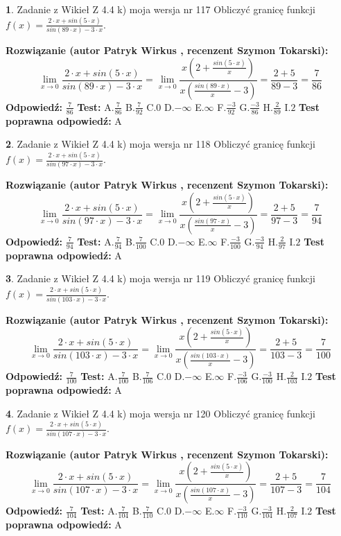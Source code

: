 \documentclass[12pt, a4paper]{article}
\theoremstyle{definition} %
\newtheorem{zad}{}
\newcommand{\zadStart}[1]{\begin{zad}#1\newline}
\newcommand{\zadStop}{\end{zad}}
\newcommand{\rozwStart}[2]{\noindent \textbf{Rozwiązanie (autor #1 , recenzent #2): }\newline}
\newcommand{\rozwStop}{\newline}
\newcommand{\odpStart}{\noindent \textbf{Odpowiedź:}\newline}
\newcommand{\odpStop}{\newline}
\newcommand{\testStart}{\noindent \textbf{Test:}\newline}
\newcommand{\testStop}{\newline}
\newcommand{\kluczStart}{\noindent \textbf{Test poprawna odpowiedź:}\newline}
\newcommand{\kluczStop}{\newline}
\begin{document}
\zadStart{Zadanie z Wikieł Z 4.4 k) moja wersja nr 117}
Obliczyć granicę funkcji $f(x)=\frac{2\cdot x +sin(5\cdot x)}{sin(89\cdot x) -3\cdot x}$.
\zadStop
\rozwStart{Patryk Wirkus}{Szymon Tokarski}
$$\lim\limits_{x\to 0}\frac{2\cdot x +sin(5\cdot x)}{sin(89\cdot x) -3\cdot x}
=\lim\limits_{x\to 0}\frac{x(2+\frac{sin(5\cdot x)}{x})}{x(\frac{sin(89\cdot x)}{x}-3)}
=\frac{2+5}{89-3} = \frac{7}{86}$$
\rozwStop
\odpStart
$\frac{7}{86}$
\odpStop
\testStart
A.$\frac{7}{86}$
B.$\frac{7}{92}$
C.$0$
D.$-\infty$
E.$\infty$
F.$\frac{-3}{92}$
G.$\frac{-3}{86}$
H.$\frac{2}{89}$
I.$2$
\testStop
\kluczStart
A
\kluczStop



\zadStart{Zadanie z Wikieł Z 4.4 k) moja wersja nr 118}
Obliczyć granicę funkcji $f(x)=\frac{2\cdot x +sin(5\cdot x)}{sin(97\cdot x) -3\cdot x}$.
\zadStop
\rozwStart{Patryk Wirkus}{Szymon Tokarski}
$$\lim\limits_{x\to 0}\frac{2\cdot x +sin(5\cdot x)}{sin(97\cdot x) -3\cdot x}
=\lim\limits_{x\to 0}\frac{x(2+\frac{sin(5\cdot x)}{x})}{x(\frac{sin(97\cdot x)}{x}-3)}
=\frac{2+5}{97-3} = \frac{7}{94}$$
\rozwStop
\odpStart
$\frac{7}{94}$
\odpStop
\testStart
A.$\frac{7}{94}$
B.$\frac{7}{100}$
C.$0$
D.$-\infty$
E.$\infty$
F.$\frac{-3}{100}$
G.$\frac{-3}{94}$
H.$\frac{2}{97}$
I.$2$
\testStop
\kluczStart
A
\kluczStop



\zadStart{Zadanie z Wikieł Z 4.4 k) moja wersja nr 119}
Obliczyć granicę funkcji $f(x)=\frac{2\cdot x +sin(5\cdot x)}{sin(103\cdot x) -3\cdot x}$.
\zadStop
\rozwStart{Patryk Wirkus}{Szymon Tokarski}
$$\lim\limits_{x\to 0}\frac{2\cdot x +sin(5\cdot x)}{sin(103\cdot x) -3\cdot x}
=\lim\limits_{x\to 0}\frac{x(2+\frac{sin(5\cdot x)}{x})}{x(\frac{sin(103\cdot x)}{x}-3)}
=\frac{2+5}{103-3} = \frac{7}{100}$$
\rozwStop
\odpStart
$\frac{7}{100}$
\odpStop
\testStart
A.$\frac{7}{100}$
B.$\frac{7}{106}$
C.$0$
D.$-\infty$
E.$\infty$
F.$\frac{-3}{106}$
G.$\frac{-3}{100}$
H.$\frac{2}{103}$
I.$2$
\testStop
\kluczStart
A
\kluczStop



\zadStart{Zadanie z Wikieł Z 4.4 k) moja wersja nr 120}
Obliczyć granicę funkcji $f(x)=\frac{2\cdot x +sin(5\cdot x)}{sin(107\cdot x) -3\cdot x}$.
\zadStop
\rozwStart{Patryk Wirkus}{Szymon Tokarski}
$$\lim\limits_{x\to 0}\frac{2\cdot x +sin(5\cdot x)}{sin(107\cdot x) -3\cdot x}
=\lim\limits_{x\to 0}\frac{x(2+\frac{sin(5\cdot x)}{x})}{x(\frac{sin(107\cdot x)}{x}-3)}
=\frac{2+5}{107-3} = \frac{7}{104}$$
\rozwStop
\odpStart
$\frac{7}{104}$
\odpStop
\testStart
A.$\frac{7}{104}$
B.$\frac{7}{110}$
C.$0$
D.$-\infty$
E.$\infty$
F.$\frac{-3}{110}$
G.$\frac{-3}{104}$
H.$\frac{2}{107}$
I.$2$
\testStop
\kluczStart
A
\kluczStop
\end{document}
